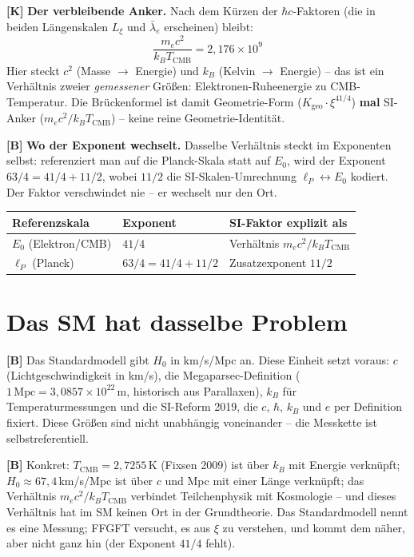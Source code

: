 \textbf{[K]} \textbf{Der verbleibende Anker.} Nach dem Kürzen der $\hbar c$-Faktoren
(die in beiden Längenskalen $L_\xi$ und $\bar\lambda_e$ erscheinen) bleibt:
\[
  \boxed{\;\frac{m_ec^2}{k_BT_\text{CMB}} = 2{,}176\times10^9\;}
\]
Hier steckt $c^2$ (Masse $\to$ Energie) und $k_B$ (Kelvin $\to$ Energie) -- das
ist ein Verhältnis zweier \emph{gemessener} Größen: Elektronen-Ruheenergie zu
CMB-Temperatur. Die Brückenformel ist damit Geometrie-Form ($K_\text{geo}\cdot\xi^{41/4}$)
\textbf{mal} SI-Anker ($m_ec^2/k_BT_\text{CMB}$) -- keine reine Geometrie-Identität.

\textbf{[B]} \textbf{Wo der Exponent wechselt.} Dasselbe Verhältnis steckt im
Exponenten selbst: referenziert man auf die Planck-Skala statt auf $E_0$, wird
der Exponent $63/4=41/4+11/2$, wobei $11/2$ die SI-Skalen-Umrechnung
$\ell_P\leftrightarrow E_0$ kodiert. Der Faktor verschwindet nie -- er wechselt
nur den Ort.

\begin{center}
\renewcommand{\arraystretch}{1.3}
{\small
\begin{tabular}{lll}
\toprule
Referenzskala & Exponent & SI-Faktor explizit als \\
\midrule
$E_0$ (Elektron/CMB) & $41/4$ & Verhältnis $m_ec^2/k_BT_\text{CMB}$ \\
$\ell_P$ (Planck)    & $63/4 = 41/4+11/2$ & Zusatzexponent $11/2$ \\
\bottomrule
\end{tabular}
}
\renewcommand{\arraystretch}{1.0}
\end{center}

\section{Das SM hat dasselbe Problem}

\textbf{[B]} Das Standardmodell gibt $H_0$ in km/s/Mpc an. Diese Einheit setzt
voraus: $c$ (Lichtgeschwindigkeit in km/s), die Megaparsec-Definition ($1\,\text{Mpc}
=3{,}0857\times10^{22}\,\text{m}$, historisch aus Parallaxen), $k_B$ für
Temperaturmessungen und die SI-Reform 2019, die $c$, $\hbar$, $k_B$ und $e$
per Definition fixiert. Diese Größen sind nicht unabhängig voneinander -- die
Messkette ist selbstreferentiell.

\textbf{[B]} Konkret: $T_\text{CMB}=2{,}7255\,$K (Fixsen 2009) ist über $k_B$ mit Energie
verknüpft; $H_0\approx67{,}4\,$km/s/Mpc ist über $c$ und Mpc mit einer Länge
verknüpft; das Verhältnis $m_ec^2/k_BT_\text{CMB}$ verbindet Teilchenphysik mit
Kosmologie -- und dieses Verhältnis hat im SM keinen Ort in der Grundtheorie.
Das Standardmodell nennt es eine Messung; FFGFT versucht, es aus $\xi$ zu
verstehen, und kommt dem näher, aber nicht ganz hin (der Exponent $41/4$ fehlt).

